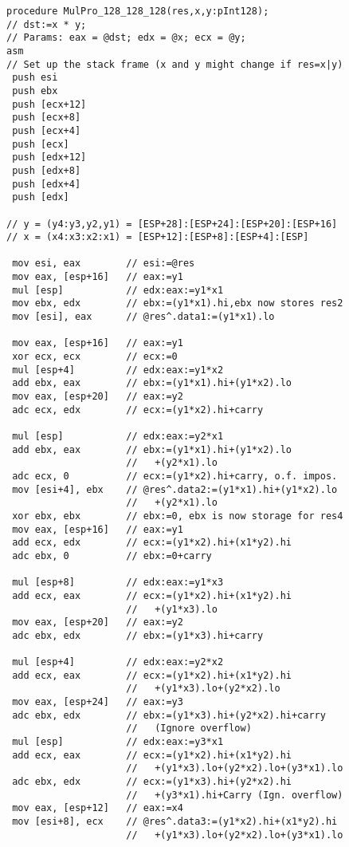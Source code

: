 \begin{multicols}{2}
{\tiny
\begin{verbatim}
procedure MulPro_128_128_128(res,x,y:pInt128);
// dst:=x * y;
// Params: eax = @dst; edx = @x; ecx = @y;
asm
// Set up the stack frame (x and y might change if res=x|y)
 push esi
 push ebx
 push [ecx+12]
 push [ecx+8]
 push [ecx+4]
 push [ecx]
 push [edx+12]
 push [edx+8]
 push [edx+4]
 push [edx]

// y = (y4:y3,y2,y1) = [ESP+28]:[ESP+24]:[ESP+20]:[ESP+16]
// x = (x4:x3:x2:x1) = [ESP+12]:[ESP+8]:[ESP+4]:[ESP]

 mov esi, eax        // esi:=@res
 mov eax, [esp+16]   // eax:=y1
 mul [esp]           // edx:eax:=y1*x1
 mov ebx, edx        // ebx:=(y1*x1).hi,ebx now stores res2
 mov [esi], eax      // @res^.data1:=(y1*x1).lo

 mov eax, [esp+16]   // eax:=y1
 xor ecx, ecx        // ecx:=0
 mul [esp+4]         // edx:eax:=y1*x2
 add ebx, eax        // ebx:=(y1*x1).hi+(y1*x2).lo
 mov eax, [esp+20]   // eax:=y2
 adc ecx, edx        // ecx:=(y1*x2).hi+carry

 mul [esp]           // edx:eax:=y2*x1
 add ebx, eax        // ebx:=(y1*x1).hi+(y1*x2).lo
                     //   +(y2*x1).lo
 adc ecx, 0          // ecx:=(y1*x2).hi+carry, o.f. impos.
 mov [esi+4], ebx    // @res^.data2:=(y1*x1).hi+(y1*x2).lo
                     //   +(y2*x1).lo
 xor ebx, ebx        // ebx:=0, ebx is now storage for res4
 mov eax, [esp+16]   // eax:=y1
 add ecx, edx        // ecx:=(y1*x2).hi+(x1*y2).hi
 adc ebx, 0          // ebx:=0+carry

 mul [esp+8]         // edx:eax:=y1*x3
 add ecx, eax        // ecx:=(y1*x2).hi+(x1*y2).hi
                     //   +(y1*x3).lo
 mov eax, [esp+20]   // eax:=y2
 adc ebx, edx        // ebx:=(y1*x3).hi+carry

 mul [esp+4]         // edx:eax:=y2*x2
 add ecx, eax        // ecx:=(y1*x2).hi+(x1*y2).hi
                     //   +(y1*x3).lo+(y2*x2).lo
 mov eax, [esp+24]   // eax:=y3
 adc ebx, edx        // ebx:=(y1*x3).hi+(y2*x2).hi+carry
                     //   (Ignore overflow)
 mul [esp]           // edx:eax:=y3*x1
 add ecx, eax        // ecx:=(y1*x2).hi+(x1*y2).hi
                     //   +(y1*x3).lo+(y2*x2).lo+(y3*x1).lo
 adc ebx, edx        // ecx:=(y1*x3).hi+(y2*x2).hi
                     //   +(y3*x1).hi+Carry (Ign. overflow)
 mov eax, [esp+12]   // eax:=x4
 mov [esi+8], ecx    // @res^.data3:=(y1*x2).hi+(x1*y2).hi
                     //   +(y1*x3).lo+(y2*x2).lo+(y3*x1).lo


\end{verbatim}}
\end{multicols}
